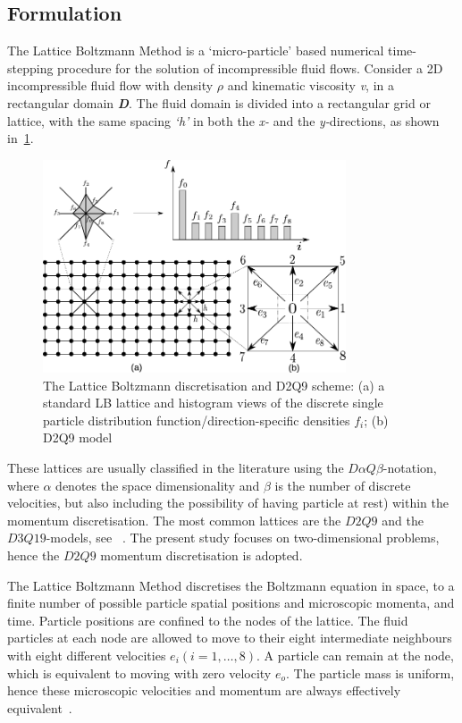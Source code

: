 \subsection{Formulation}
The Lattice Boltzmann Method is a `micro-particle' based numerical time-stepping procedure for the solution of incompressible fluid flows. Consider a 2D incompressible fluid flow with density $\rho$ and kinematic viscosity \textit{v}, in a rectangular domain \textit{\textbf{D}}. The fluid domain is divided into a rectangular grid or lattice, with the same spacing \textit{`h'} in both the \textit{x-} and the \textit{y-}directions, as shown in~\cref{fig:D2Q9}. 

\begin{figure}[htpb]
\centering
\includegraphics[width=0.8\textwidth]{D2Q9}
\caption[The Lattice Boltzmann discretisation and D2Q9 scheme]{The Lattice Boltzmann discretisation and D2Q9 scheme: (a) a standard LB lattice and histogram views of the discrete single particle distribution function/direction-specific densities $f_i$; (b) D2Q9 model}
\label{fig:D2Q9}
\end{figure}

These lattices are usually classified in the literature using the $\mathit{D}\alpha\mathit{Q}\beta$-notation, where $\alpha$ denotes the space dimensionality and $\beta$ is the number of discrete velocities, but also including the possibility of having particle at rest) within the momentum discretisation. The most common lattices are the $\mathit{D2Q9}$ and the $\mathit{D3Q19}$-models, see ~\citet{He1997}. The present study focuses on two-dimensional problems, hence the $\mathit{D2Q9}$ momentum discretisation is adopted.

The Lattice Boltzmann Method discretises the Boltzmann equation in space, to a finite number of possible particle spatial positions and microscopic momenta, and time. Particle positions are confined to the nodes of the lattice. The fluid particles at each node are allowed to move to their eight intermediate neighbours with eight different velocities $\mathit{e_i} (\mathit{i}=1,\dots,8)$. A particle can remain at the node, which is equivalent to moving with zero velocity $\mathit{e_o}$. The particle mass is uniform, hence these microscopic velocities and momentum are always effectively equivalent~\citep{Han2007}.

